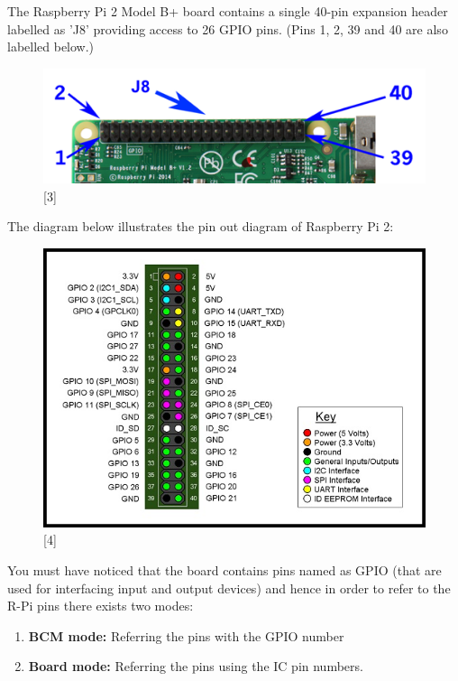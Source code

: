 \documentclass[11pt,a4paper]{report}
\begin{document}
\begin{flushleft}
	The Raspberry Pi 2 Model B+ board contains a single 40-pin expansion header labelled as 'J8' providing access to 26 GPIO pins.
	(Pins 1, 2, 39 and 40 are also labelled below.)
			\begin{figure}[h!]
				\includegraphics[scale=0.7]{j8h.png}
				\centering
				\caption{[3]}
			\end{figure} 
	
	\newpage
	The diagram below illustrates the pin out diagram of Raspberry Pi 2:
	\begin{figure}[h!]
		\includegraphics[scale=0.6]{RaspberryPi2_pinout.jpg}
		\centering
		\caption{[4]}
	\end{figure} 
	
	\flushleft
	You must have noticed that the board contains pins named as GPIO (that are used for interfacing input and output devices) and hence in order to refer to the R-Pi pins there exists two modes:
	\begin{enumerate}
		\item \textbf{BCM mode:} Referring the pins with the GPIO number
		\item \textbf{Board mode:} Referring the pins using the IC pin numbers.
	\end{enumerate}

\end{flushleft}
\end{document}
